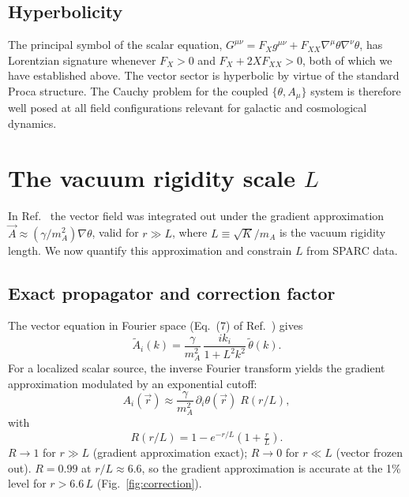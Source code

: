 \documentclass[aps,prd,reprint,floatfix,nofootinbib,superscriptaddress]{revtex4-2}
\begin{document}
\subsection{Hyperbolicity}

The principal symbol of the scalar equation,
$G^{\mu\nu} = F_X g^{\mu\nu} + F_{XX}\nabla^\mu\theta\nabla^\nu\theta$,
has Lorentzian signature whenever $F_X > 0$ and
$F_X + 2XF_{XX} > 0$, both of which we have established above.
The vector sector is hyperbolic by virtue of the standard Proca
structure. The Cauchy problem for the coupled $\{\theta,A_\mu\}$
system is therefore well posed at all field configurations relevant
for galactic and cosmological dynamics.

\section{The vacuum rigidity scale \texorpdfstring{$L$}{L}}
\label{sec:vector_scale}

In Ref.~\cite{Mendes2026} the vector field was integrated out under
the gradient approximation
$\vec{A}\approx(\gamma/m_A^2)\nabla\theta$, valid for $r\gg L$,
where $L \equiv \sqrt{K}/m_A$ is the vacuum rigidity length. We now
quantify this approximation and constrain $L$ from SPARC data.

\subsection{Exact propagator and correction factor}

The vector equation in Fourier space (Eq.~(7) of
Ref.~\cite{Mendes2026}) gives
\begin{equation}
  \tilde A_i(k) = \frac{\gamma}{m_A^2}\,
                  \frac{i k_i}{1 + L^2 k^2}\,\tilde\theta(k).
\end{equation}
For a localized scalar source, the inverse Fourier transform yields
the gradient approximation modulated by an exponential cutoff:
\begin{equation}
  A_i(\vec{r}) \approx \frac{\gamma}{m_A^2}\,
                       \partial_i\theta(\vec{r})\;R(r/L),
  \label{eq:correction}
\end{equation}
with
\begin{equation}
  R(r/L) = 1 - e^{-r/L}\!\left(1 + \tfrac{r}{L}\right).
  \label{eq:R_factor}
\end{equation}
$R\to 1$ for $r\gg L$ (gradient approximation exact); $R\to 0$ for
$r\ll L$ (vector frozen out). $R = 0.99$ at $r/L \approx 6.6$, so the
gradient approximation is accurate at the 1\% level for $r > 6.6\,L$
(Fig.~\ref{fig:correction}).
\end{document}
